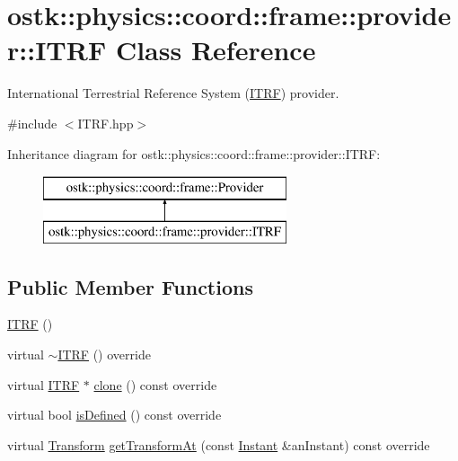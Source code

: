 \hypertarget{classostk_1_1physics_1_1coord_1_1frame_1_1provider_1_1_i_t_r_f}{}\section{ostk\+:\+:physics\+:\+:coord\+:\+:frame\+:\+:provider\+:\+:I\+T\+RF Class Reference}
\label{classostk_1_1physics_1_1coord_1_1frame_1_1provider_1_1_i_t_r_f}


International Terrestrial Reference System (\hyperlink{classostk_1_1physics_1_1coord_1_1frame_1_1provider_1_1_i_t_r_f}{I\+T\+RF}) provider.  




{\ttfamily \#include $<$I\+T\+R\+F.\+hpp$>$}

Inheritance diagram for ostk\+:\+:physics\+:\+:coord\+:\+:frame\+:\+:provider\+:\+:I\+T\+RF\+:\begin{figure}[H]
\begin{center}
\leavevmode
\includegraphics[height=2.000000cm]{classostk_1_1physics_1_1coord_1_1frame_1_1provider_1_1_i_t_r_f}
\end{center}
\end{figure}
\subsection*{Public Member Functions}
\begin{DoxyCompactItemize}
\item 
\hyperlink{classostk_1_1physics_1_1coord_1_1frame_1_1provider_1_1_i_t_r_f_a8b1ca7dc9e763e927263bb1b57237208}{I\+T\+RF} ()
\item 
virtual \hyperlink{classostk_1_1physics_1_1coord_1_1frame_1_1provider_1_1_i_t_r_f_a70c48b2f1f9816a858144d8dde762b5d}{$\sim$\+I\+T\+RF} () override
\item 
virtual \hyperlink{classostk_1_1physics_1_1coord_1_1frame_1_1provider_1_1_i_t_r_f}{I\+T\+RF} $\ast$ \hyperlink{classostk_1_1physics_1_1coord_1_1frame_1_1provider_1_1_i_t_r_f_aad7e29329b68f264bed571bf48b902a4}{clone} () const override
\item 
virtual bool \hyperlink{classostk_1_1physics_1_1coord_1_1frame_1_1provider_1_1_i_t_r_f_a2f3a53b002d54f1adf829cefc2cf7393}{is\+Defined} () const override
\item 
virtual \hyperlink{classostk_1_1physics_1_1coord_1_1_transform}{Transform} \hyperlink{classostk_1_1physics_1_1coord_1_1frame_1_1provider_1_1_i_t_r_f_a6e344e7252a962d4451e2c0ea866bc30}{get\+Transform\+At} (const \hyperlink{classostk_1_1physics_1_1time_1_1_instant}{Instant} \&an\+Instant) const override
\end{DoxyCompactItemize}


